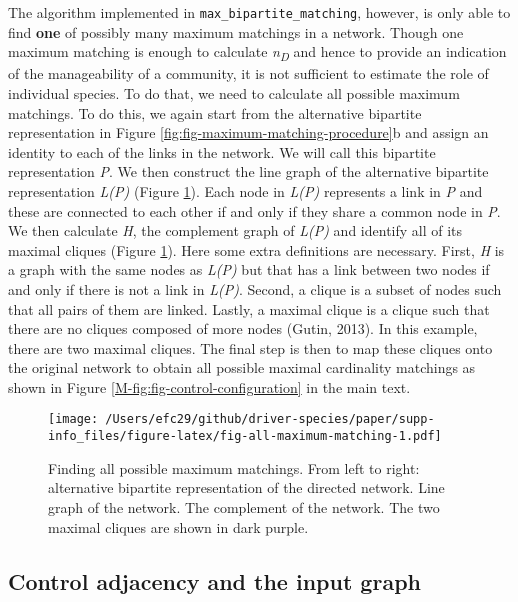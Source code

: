 \documentclass[a4paper]{artikel1}
\theoremstyle{definition}
\theoremstyle{definition}
\theoremstyle{definition}
\theoremstyle{remark}
\begin{document}
The algorithm implemented in \texttt{max\_bipartite\_matching}, however,
is only able to find \textbf{one} of possibly many maximum matchings in
a network. Though one maximum matching is enough to calculate
\emph{n\textsubscript{D}} and hence to provide an indication of the
manageability of a community, it is not sufficient to estimate the role
of individual species. To do that, we need to calculate all possible
maximum matchings. To do this, we again start from the alternative
bipartite representation in Figure
\ref{fig:fig-maximum-matching-procedure}b and assign an identity to each
of the links in the network. We will call this bipartite representation
\emph{P}. We then construct the line graph of the alternative bipartite
representation \emph{L(P)} (Figure \ref{fig:fig-all-maximum-matching}).
Each node in \emph{L(P)} represents a link in \emph{P} and these are
connected to each other if and only if they share a common node in
\emph{P}. We then calculate \emph{H}, the complement graph of
\emph{L(P)} and identify all of its maximal cliques (Figure
\ref{fig:fig-all-maximum-matching}). Here some extra definitions are
necessary. First, \emph{H} is a graph with the same nodes as \emph{L(P)}
but that has a link between two nodes if and only if there is not a link
in \emph{L(P)}. Second, a clique is a subset of nodes such that all
pairs of them are linked. Lastly, a maximal clique is a clique such that
there are no cliques composed of more nodes (Gutin, 2013). In this
example, there are two maximal cliques. The final step is then to map
these cliques onto the original network to obtain all possible maximal
cardinality matchings as shown in Figure
\ref{M-fig:fig-control-configuration} in the main text.

\begin{figure}
\centering
\texttt{[image: /Users/efc29/github/driver-species/paper/supp-info\_files/figure-latex/fig-all-maximum-matching-1.pdf]}
\caption{\label{fig:fig-all-maximum-matching}Finding all possible maximum
matchings. From left to right: alternative bipartite representation of
the directed network. Line graph of the network. The complement of the
network. The two maximal cliques are shown in dark purple.}
\end{figure}

\clearpage

\subsection{Control adjacency and the input graph}\label{input-graph}
\end{document}
